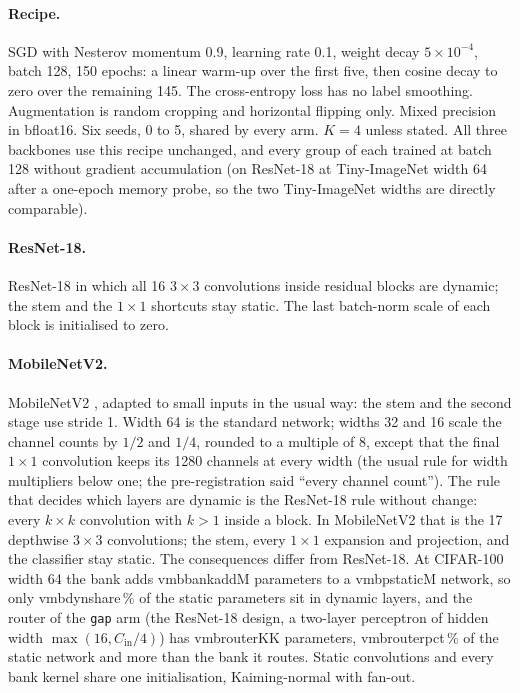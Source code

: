 \documentclass[10pt,a4paper]{article}
\newcommand{\V}[1]{\csname v#1\endcsname}
\begin{document}
\paragraph{Recipe.} SGD with Nesterov momentum 0.9, learning rate 0.1,
weight decay $5\times10^{-4}$, batch 128, 150 epochs: a linear warm-up over
the first five, then cosine decay to zero over the remaining 145. The
cross-entropy loss has no label smoothing. Augmentation is random cropping and horizontal
flipping only. Mixed precision in bfloat16. Six seeds, 0 to 5, shared by
every arm. $K=4$ unless stated. All three backbones use this recipe
unchanged, and every group of each trained at batch 128 without gradient
accumulation (on ResNet-18 at Tiny-ImageNet width 64 after a one-epoch
memory probe, so the two Tiny-ImageNet widths are directly comparable).

\paragraph{ResNet-18.} ResNet-18 \citep{he2016deep} in which all 16
$3\times3$ convolutions inside residual blocks are dynamic; the stem and
the $1\times1$ shortcuts stay static. The last batch-norm scale of each
block is initialised to zero.

\paragraph{MobileNetV2.} MobileNetV2 \citep{sandler2018mobilenetv2},
adapted to small inputs in the usual way: the stem and the second stage
use stride 1. Width 64 is the standard network; widths 32 and 16 scale the
channel counts by $1/2$ and $1/4$, rounded to a multiple of 8, except that
the final $1\times1$ convolution keeps its 1280 channels at every width (the
usual rule for width multipliers below one; the pre-registration said
``every channel count''). The
rule that decides which layers are dynamic is the ResNet-18 rule without
change: every $k\times k$ convolution with $k>1$ inside a block. In
MobileNetV2 that is the 17 depthwise $3\times3$ convolutions; the stem,
every $1\times1$ expansion and projection, and the classifier stay
static. The consequences differ from ResNet-18. At CIFAR-100 width 64 the
bank adds \V{mbbankadd}M parameters to a \V{mbpstatic}M network, so only
\V{mbdynshare}\,\% of the static parameters sit in dynamic layers, and the
router of the \texttt{gap} arm (the ResNet-18 design, a two-layer
perceptron of hidden width $\max(16,C_{\text{in}}/4)$) has \V{mbrouterK}K
parameters, \V{mbrouterpct}\,\% of the static network and more than the
bank it routes. Static convolutions and every bank kernel share one
initialisation, Kaiming-normal with fan-out.
\end{document}
